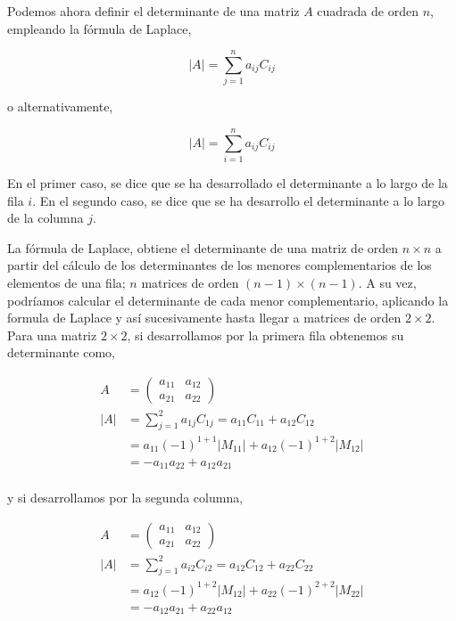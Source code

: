 \begin{paracol}{2}
Podemos ahora definir el determinante de una matriz $A$ cuadrada de orden $n$, empleando la fórmula de Laplace, 
\end{paracol}
\begin{equation*}
\vert A \vert = \sum_{j=1}^n a_{ij}C_{ij}
\end{equation*}
\begin{paracol}{2}
o alternativamente,
\end{paracol}

\begin{equation*}
\vert A \vert = \sum_{i=1}^n a_{ij}C_{ij}
\end{equation*}
\begin{paracol}{2}
En el primer caso, se dice que se ha desarrollado el determinante a lo largo de la fila $i$. En el segundo caso, se dice que se ha desarrollo el determinante a lo largo de la columna $j$.

 La fórmula de Laplace, obtiene el determinante de una matriz de orden $n\times n$ a partir del cálculo de los determinantes de los menores complementarios de los elementos de una fila; $n$ matrices de orden $(n-1)\times (n-1)$. A su vez, podríamos calcular el determinante de cada menor complementario, aplicando la formula de Laplace y así sucesivamente hasta llegar a matrices de orden $2\times 2$. Para una matriz $2\times 2$, si desarrollamos por la primera fila obtenemos su determinante como,
\end{paracol}

\begin{align*}
A&=\begin{pmatrix}
a_{11}& a_{12}\\
a_{21}& a_{22}
\end{pmatrix}\\
\vert A \vert & =\sum_{j=1}^2a_{1j}C_{1j} =a_{11}C_{11}+a_{12}C_{12}\\
 &=a_{11}(-1)^{1+1}\vert M_{11}\vert +a_{12}(-1)^{1+2}\vert M_{12}\vert \\
 &=-a_{11}a_{22}+a_{12}a_{21}\\
\end{align*}

\begin{paracol}{2}
y si desarrollamos por la segunda columna,
\end{paracol}
\begin{align*}
A&=\begin{pmatrix}
a_{11}& a_{12}\\
a_{21}& a_{22}
\end{pmatrix}\\
\vert A \vert & =\sum_{j=1}^2a_{i2}C_{i2} =a_{12}C_{12}+a_{22}C_{22}\\
 &=a_{12}(-1)^{1+2}\vert M_{12}\vert +a_{22}(-1)^{2+2}\vert M_{22}\vert \\
 &=-a_{12}a_{21}+a_{22}a_{12}\\
\end{align*}

